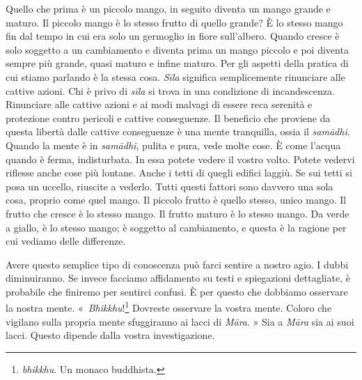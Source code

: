 Quello che prima è un piccolo mango, in seguito diventa un mango grande
e maturo. Il piccolo mango è lo stesso frutto di quello grande? È lo
stesso mango fin dal tempo in cui era solo un germoglio in fiore
sull'albero. Quando cresce è solo soggetto a un cambiamento e diventa
prima un mango piccolo e poi diventa sempre più grande, quasi maturo e
infine maturo. Per gli aspetti della pratica di cui stiamo parlando è la
stessa cosa. \emph{Sīla} significa semplicemente rinunciare alle cattive
azioni. Chi è privo di \emph{sīla} si trova in una condizione di
incandescenza. Rinunciare alle cattive azioni e ai modi malvagi di
essere reca serenità e protezione contro pericoli e cattive conseguenze.
Il beneficio che proviene da questa libertà dalle cattive conseguenze è
una mente tranquilla, ossia il \emph{samādhi}. Quando la mente è in
\emph{samādhi}, pulita e pura, vede molte cose. È come l'acqua quando è
ferma, indisturbata. In essa potete vedere il vostro volto. Potete
vedervi riflesse anche cose più lontane. Anche i tetti di quegli edifici
laggiù. Se sui tetti si posa un uccello, riuscite a vederlo. Tutti
questi fattori sono davvero una sola cosa, proprio come quel mango. Il
piccolo frutto è quello stesso, unico mango. Il frutto che cresce è lo
stesso mango. Il frutto maturo è lo stesso mango. Da verde a giallo, è
lo stesso mango; è soggetto al cambiamento, e questa è la ragione per
cui vediamo delle differenze.

Avere questo semplice tipo di conoscenza può farci sentire a nostro
agio. I dubbi diminuiranno. Se invece facciamo affidamento su testi e
spiegazioni dettagliate, è probabile che finiremo per sentirci confusi.
È per questo che dobbiamo osservare la nostra mente.
«~\emph{Bhikkhu}!\footnote{\emph{bhikkhu}. Un monaco buddhista.}
Dovreste osservare la vostra mente. Coloro che vigilano sulla propria
mente sfuggiranno ai lacci di \emph{Māra}. » Sia a \emph{Māra} sia ai
suoi lacci. Questo dipende dalla vostra investigazione.

